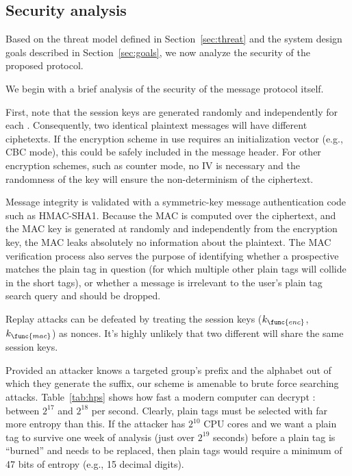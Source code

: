 \subsection{Security analysis}
\label{sec:security}

Based on the threat model defined in Section~\ref{sec:threat} and the
system design goals described in Section~\ref{sec:goals}, we now analyze
the security of the proposed \hoot protocol.

%
We begin with a brief analysis of the security of the message protocol
itself.

First, note that the session keys are generated randomly and
independently for each \msg. Consequently, two identical plaintext
messages will have different ciphetexts. If the encryption scheme in use
requires an initialization vector (e.g., CBC mode), this could be safely
included in the message header. For other encryption schemes, such as
counter mode, no IV is necessary and the randomness of the key will
ensure the non-determinism of the ciphertext.

Message integrity is validated with a symmetric-key message
authentication code such as HMAC-SHA1. Because the MAC is computed over
the ciphertext, and the MAC key is generated at randomly and
independently from the encryption key, the MAC leaks absolutely no
information about the plaintext. The MAC verification process also
serves the purpose of identifying whether a prospective \msg matches the
plain tag in question (for which multiple other plain tags will collide
in the short tags), or whether a message is irrelevant to the user's
plain tag search query and should be dropped.

Replay attacks can be defeated by treating the session keys
($k_{\func{enc}}$, $k_{\func{mac}}$) as nonces. It's highly unlikely
that two different \msgs will share the same session keys.


%
Provided an attacker knows a targeted group's prefix and the alphabet
out of which they generate the suffix, our scheme is amenable to brute
force searching attacks. Table~\ref{tab:hps} shows how fast a modern
computer can decrypt \msgs: between $2^{17}$ and $2^{18}$ per
second. Clearly, plain tags must be selected with far more entropy than
this. If the attacker has $2^{10}$ CPU cores and we want a plain tag to
survive one week of analysis (just over $2^{19}$ seconds) before a plain
tag is ``burned'' and needs to be replaced, then plain tags would
require a minimum of 47 bits of entropy (e.g., 15 decimal digits).

